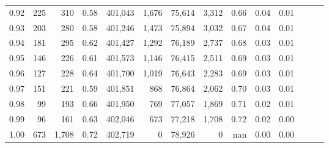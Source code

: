 \begin{tabular}{rrrrrrrrrrrrrr}
0.92 &    225 &    310 &  0.58 &  401,043 &    1,676 &  75,614 &   3,312 &  0.66 &  0.04 &      0.01 \\
0.93 &    203 &    280 &  0.58 &  401,246 &    1,473 &  75,894 &   3,032 &  0.67 &  0.04 &      0.01 \\
0.94 &    181 &    295 &  0.62 &  401,427 &    1,292 &  76,189 &   2,737 &  0.68 &  0.03 &      0.01 \\
0.95 &    146 &    226 &  0.61 &  401,573 &    1,146 &  76,415 &   2,511 &  0.69 &  0.03 &      0.01 \\
0.96 &    127 &    228 &  0.64 &  401,700 &    1,019 &  76,643 &   2,283 &  0.69 &  0.03 &      0.01 \\
0.97 &    151 &    221 &  0.59 &  401,851 &      868 &  76,864 &   2,062 &  0.70 &  0.03 &      0.01 \\
0.98 &     99 &    193 &  0.66 &  401,950 &      769 &  77,057 &   1,869 &  0.71 &  0.02 &      0.01 \\
0.99 &     96 &    161 &  0.63 &  402,046 &      673 &  77,218 &   1,708 &  0.72 &  0.02 &      0.00 \\
1.00 &    673 &  1,708 &  0.72 &  402,719 &        0 &  78,926 &       0 &   nan &  0.00 &      0.00 \\
\bottomrule
\end{tabular}
